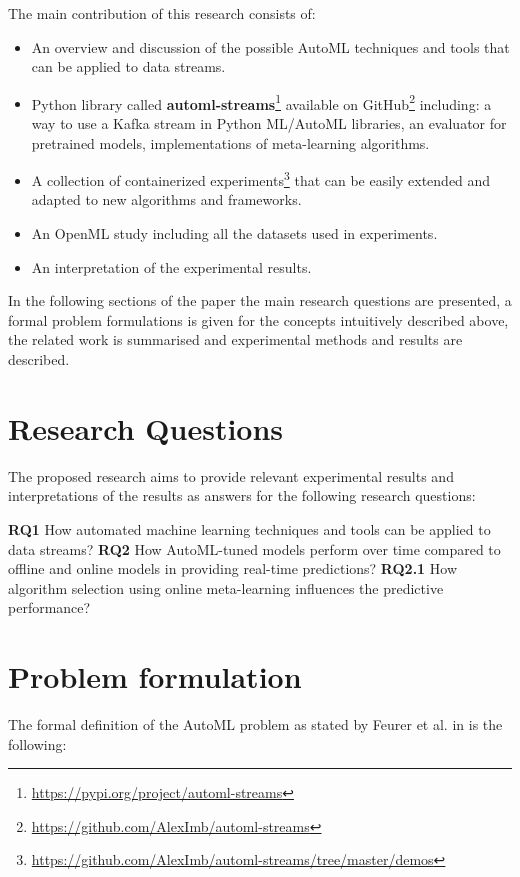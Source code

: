 \documentclass{sig-alternate-br}
\begin{document}
The main contribution of this research consists of:
\begin{itemize}
  \item An overview and discussion of the possible AutoML techniques and tools that can be applied to data streams.
  \item Python library called \textbf{automl-streams}\footnote{\url{https://pypi.org/project/automl-streams}} available on GitHub\footnote{\url{https://github.com/AlexImb/automl-streams}} including: a way to use a Kafka stream in Python ML/AutoML libraries, an evaluator for pretrained models, implementations of meta-learning algorithms.
  \item A collection of containerized experiments\footnote{\url{https://github.com/AlexImb/automl-streams/tree/master/demos}} that can be easily extended and adapted to new algorithms and frameworks.
  \item An OpenML \cite{vanschoren2014openml} study including all the datasets used in experiments.
  \item An interpretation of the experimental results.
 
\end{itemize}

In the following sections of the paper the main research questions are presented, a formal problem formulations is given for the concepts intuitively described above, the related work is summarised and experimental methods and results are described.

\section{Research Questions}
The proposed research aims to provide relevant experimental results and interpretations of the results as answers for the following research questions: 

\textbf{RQ1} How automated machine learning techniques and tools can be applied to data streams?
\newline
\newline
\textbf{RQ2} How AutoML-tuned models perform over time compared to offline and online models in providing real-time predictions?
		\newline\-\hspace{0.5cm}\textbf{RQ2.1} How algorithm selection using online meta-learning influences the predictive performance?
    
\section{Problem formulation}
The formal definition of the AutoML problem as stated by Feurer et al. in \cite{feurer2015autosklearn} is the following:
\end{document}
